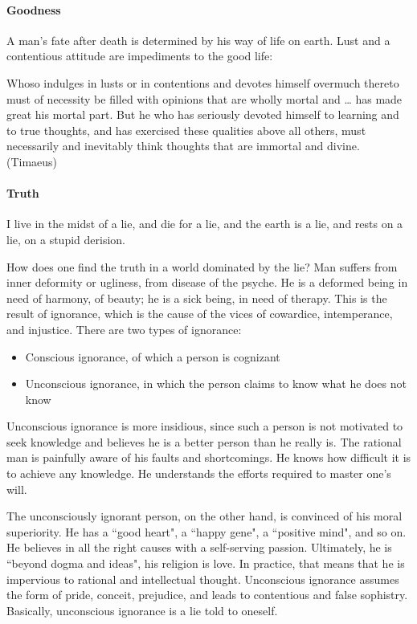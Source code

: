 \paragraph{Goodness}
A man's fate after death is determined by his way of life on earth. Lust and a contentious attitude are impediments to the good life:

\begin{quotex}
Whoso indulges in lusts or in contentions and devotes himself overmuch thereto must of necessity be filled with opinions that are wholly mortal and … has made great his mortal part. But he who has seriously devoted himself to learning and to true thoughts, and has exercised these qualities above all others, must necessarily and inevitably think thoughts that are immortal and divine. (Timaeus) 

\end{quotex}
\paragraph{Truth}
\begin{quotex}
I live in the midst of a lie, and die for a lie, and the earth is a lie, and rests on a lie, on a stupid derision. 

\end{quotex}
How does one find the truth in a world dominated by the lie? Man suffers from inner deformity or ugliness, from disease of the psyche. He is a deformed being in need of harmony, of beauty; he is a sick being, in need of therapy. This is the result of ignorance, which is the cause of the vices of cowardice, intemperance, and injustice. There are two types of ignorance:

\begin{itemize}
\item Conscious ignorance, of which a person is cognizant 
\item Unconscious ignorance, in which the person claims to know what he does not know 
\end{itemize}
Unconscious ignorance is more insidious, since such a person is not motivated to seek knowledge and believes he is a better person than he really is. The rational man is painfully aware of his faults and shortcomings. He knows how difficult it is to achieve any knowledge. He understands the efforts required to master one's will.

The unconsciously ignorant person, on the other hand, is convinced of his moral superiority. He has a ``good heart", a ``happy gene", a ``positive mind", and so on. He believes in all the right causes with a self-serving passion. Ultimately, he is ``beyond dogma and ideas", his religion is love. In practice, that means that he is impervious to rational and intellectual thought. Unconscious ignorance assumes the form of pride, conceit, prejudice, and leads to contentious and false sophistry. Basically, unconscious ignorance is a lie told to oneself.


